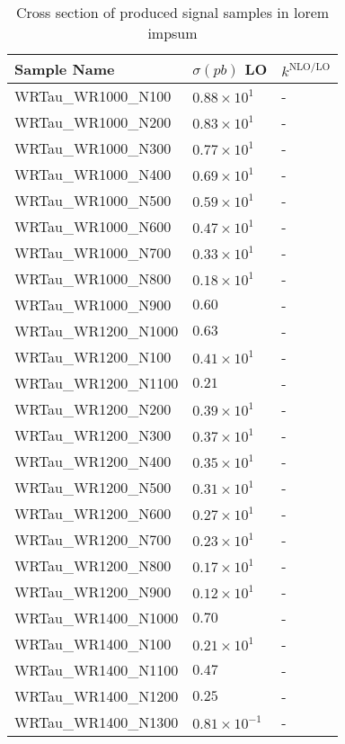 \begin{longtable}[c]{| C{.35\textwidth} | C{.15\textwidth} | C{.1\textwidth}|} 
    \caption{Cross section of produced signal samples in lorem impsum}
    \label{tab:appendix_signalsample_xsec}
    \centering
    \hline
    Sample Name & $\sigma(pb)$ LO & $k^{\text{NLO/LO}}$ \\ \hline
    WRTau\_WR1000\_N100 & $0.88\times10^{1}$ & - \\
    WRTau\_WR1000\_N200 & $0.83\times10^{1}$ & - \\
    WRTau\_WR1000\_N300 & $0.77\times10^{1}$ & - \\
    WRTau\_WR1000\_N400 & $0.69\times10^{1}$ & - \\
    WRTau\_WR1000\_N500 & $0.59\times10^{1}$ & - \\
    WRTau\_WR1000\_N600 & $0.47\times10^{1}$ & - \\
    WRTau\_WR1000\_N700 & $0.33\times10^{1}$ & - \\
    WRTau\_WR1000\_N800 & $0.18\times10^{1}$ & - \\ 
    WRTau\_WR1000\_N900 & $0.60$ & - \\ \hline
    WRTau\_WR1200\_N1000 & $0.63$ & - \\
    WRTau\_WR1200\_N100 & $0.41\times10^{1}$ & - \\
    WRTau\_WR1200\_N1100 & $0.21$ & - \\
    WRTau\_WR1200\_N200 & $0.39\times10^{1}$ & - \\
    WRTau\_WR1200\_N300 & $0.37\times10^{1}$ & - \\
    WRTau\_WR1200\_N400 & $0.35\times10^{1}$ & - \\
    WRTau\_WR1200\_N500 & $0.31\times10^{1}$ & - \\
    WRTau\_WR1200\_N600 & $0.27\times10^{1}$ & - \\
    WRTau\_WR1200\_N700 & $0.23\times10^{1}$ & - \\
    WRTau\_WR1200\_N800 & $0.17\times10^{1}$ & - \\
    WRTau\_WR1200\_N900 & $0.12\times10^{1}$ & - \\ \hline
    WRTau\_WR1400\_N1000 & $0.70$ & - \\
    WRTau\_WR1400\_N100 & $0.21\times10^{1}$ & - \\
    WRTau\_WR1400\_N1100 & $0.47$ & - \\
    WRTau\_WR1400\_N1200 & $0.25$ & - \\
    WRTau\_WR1400\_N1300 & $0.81\times10^{-1}$ & - \\

\end{longtable}
